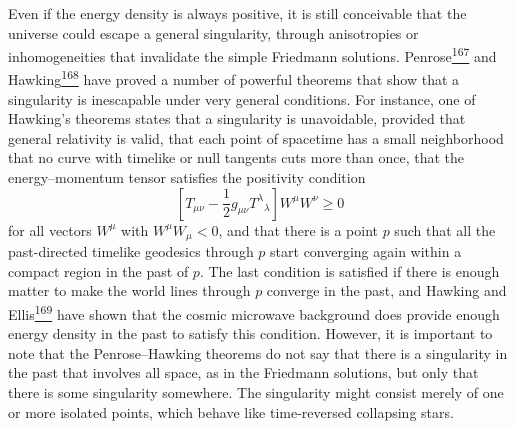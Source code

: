 Even if the energy density is always positive, it is still conceivable that
the universe could escape a general singularity, through anisotropies or
inhomogeneities that invalidate the simple Friedmann solutions.
Penrose\hyperref[ch15-ref-167]{\textsuperscript{167}} and
Hawking\hyperref[ch15-ref-168]{\textsuperscript{168}} have proved a number of
powerful theorems that show that a singularity is inescapable under very
general conditions. For instance, one of Hawking's theorems states that a
singularity is unavoidable, provided that general relativity is valid, that
each point of spacetime has a small neighborhood that no curve with timelike
or null tangents cuts more than once, that the energy--momentum tensor
satisfies the positivity condition
\[
  \left[
    T_{\mu\nu}-\frac12g_{\mu\nu}T^\lambda{}_\lambda
  \right]
  W^\mu W^\nu
  \geq0
\]
for all vectors \(W^\mu\) with \(W^\mu W_\mu<0\), and that there is a point
\(p\) such that all the past-directed timelike geodesics through \(p\) start
converging again within a compact region in the past of \(p\). The last
condition is satisfied if there is enough matter to make the world lines
through \(p\) converge in the past, and Hawking and
Ellis\hyperref[ch15-ref-169]{\textsuperscript{169}} have shown that the cosmic
microwave background does provide enough energy density in the past to satisfy
this condition. However, it is important to note that the Penrose--Hawking
theorems do not say that there is a singularity in the past that involves all
space, as in the Friedmann solutions, but only that there is some singularity
somewhere. The singularity might consist merely of one or more isolated
points, which behave like time-reversed collapsing stars.

